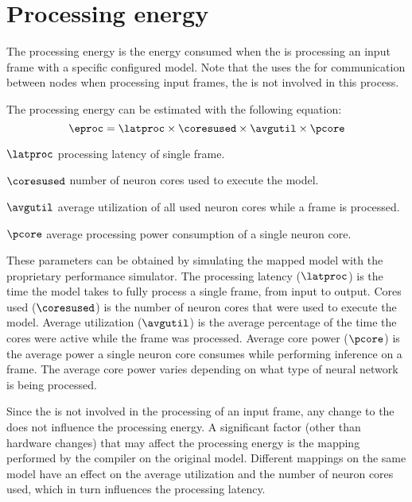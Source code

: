 \section{Processing energy}
The processing energy is the energy consumed when the \graicore{} is processing an input frame with a specific configured model.
Note that the \graicore{} uses the \eventnoc{} for communication between nodes when processing input frames, the \confignoc{} is not involved in this process.

The processing energy can be estimated with the following equation:
\begin{equation}
    \eproc = \latproc \times \coresused \times \avgutil \times \pcore
\end{equation}
\eqexplSetItemWidth{6em}
\begin{eqexpl}
    \item{$\latproc$} processing latency of single frame.
    \item{$\coresused$} number of neuron cores used to execute the model.
    \item{$\avgutil$} average utilization of all used neuron cores while a frame is processed.
    \item{$\pcore$} average processing power consumption of a single neuron core.
\end{eqexpl}

These parameters can be obtained by simulating the mapped model with the proprietary performance simulator.
The processing latency ($\latproc$) is the time the model takes to fully process a single frame, from input to output.
Cores used ($\coresused$) is the number of neuron cores that were used to execute the model.
Average utilization ($\avgutil$) is the average percentage of the time the cores were active while the frame was processed. 
Average core power ($\pcore$) is the average power a single neuron core consumes while performing inference on a frame.
The average core power varies depending on what type of neural network is being processed.

Since the \confignoc{} is not involved in the processing of an input frame, any change to the \confignoc{} does not influence the processing energy.
A significant factor (other than hardware changes) that may affect the processing energy is the mapping performed by the compiler on the original model. 
Different mappings on the same model have an effect on the average utilization and the number of neuron cores used, which in turn influences the processing latency.
